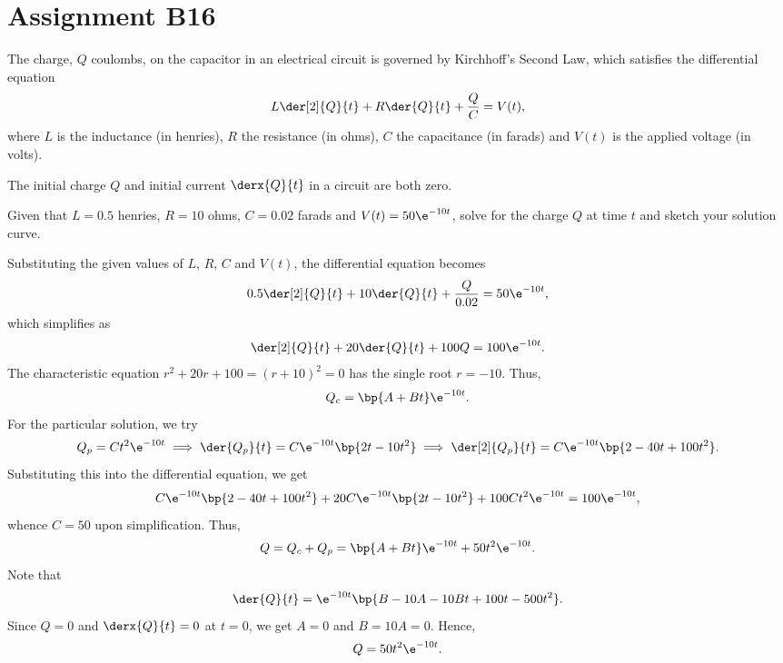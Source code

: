 \section{Assignment B16}

\begin{problem}
    The charge, $Q$ coulombs, on the capacitor in an electrical circuit is governed by Kirchhoff's Second Law, which satisfies the differential equation \[L \der[2]{Q}{t} + R \der{Q}{t} + \frac{Q}{C} = V(t),\] where $L$ is the inductance (in henries), $R$ the resistance (in ohms), $C$ the capacitance (in farads) and $V(t)$ is the applied voltage (in volts).

    The initial charge $Q$ and initial current $\derx{Q}{t}$ in a circuit are both zero.

    Given that $L = 0.5$ henries, $R = 10$ ohms, $C = 0.02$ farads and $V(t) = 50\e^{-10t}$, solve for the charge $Q$ at time $t$ and sketch your solution curve.
\end{problem}
\begin{solution}
    Substituting the given values of $L$, $R$, $C$ and $V(t)$, the differential equation becomes \[0.5 \der[2]{Q}{t} + 10 \der{Q}{t} + \frac{Q}{0.02} = 50 \e^{-10t},\] which simplifies as \[\der[2]{Q}{t} + 20 \der{Q}{t} + 100 Q = 100 \e^{-10t}.\] The characteristic equation $r^2 + 20r + 100 = (r+10)^2 = 0$ has the single root $r = -10$. Thus, \[Q_c = \bp{A + Bt} \e^{-10t}.\] For the particular solution, we try \[Q_p = Ct^2 \e^{-10t} \implies \der{Q_p}{t} = C\e^{-10t} \bp{2t - 10t^2} \implies \der[2]{Q_p}{t} = C\e^{-10t} \bp{2 - 40t + 100t^2}.\] Substituting this into the differential equation, we get \[C\e^{-10t} \bp{2 - 40t + 100t^2} + 20C\e^{-10t} \bp{2t - 10t^2} + 100Ct^2 \e^{-10t} = 100\e^{-10t},\] whence $C = 50$ upon simplification. Thus, \[Q = Q_c + Q_p = \bp{A + Bt} \e^{-10t} + 50 t^2 \e^{-10t}.\] Note that \[\der{Q}{t} = \e^{-10t} \bp{B - 10 A - 10B t + 100 t - 500t^2}.\] Since $Q = 0$ and $\derx{Q}{t} = 0$ at $t = 0$, we get $A = 0$ and $B = 10A = 0$. Hence, \[Q = 50 t^2 \e^{-10t}.\]

    \begin{figure}[H]
    \centering
    \end{figure}
\end{solution}

